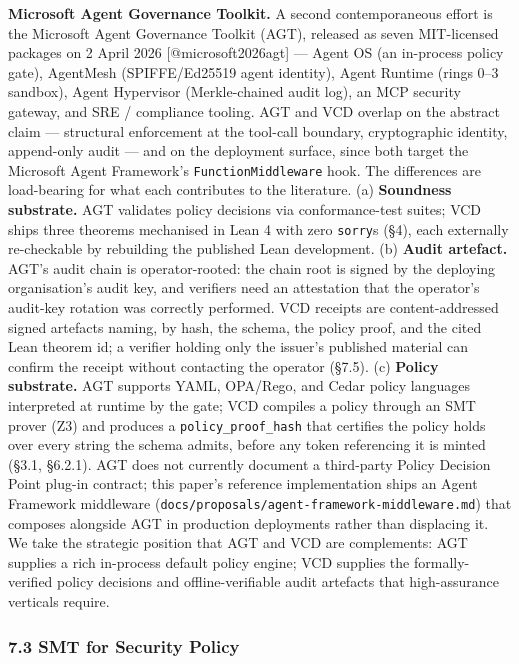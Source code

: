 \textbf{Microsoft Agent Governance Toolkit.} A second contemporaneous
effort is the Microsoft Agent Governance Toolkit (AGT), released as
seven MIT-licensed packages on 2 April 2026 {[}@microsoft2026agt{]} ---
Agent OS (an in-process policy gate), AgentMesh (SPIFFE/Ed25519 agent
identity), Agent Runtime (rings 0--3 sandbox), Agent Hypervisor
(Merkle-chained audit log), an MCP security gateway, and SRE /
compliance tooling. AGT and VCD overlap on the abstract claim ---
structural enforcement at the tool-call boundary, cryptographic
identity, append-only audit --- and on the deployment surface, since
both target the Microsoft Agent Framework's \texttt{FunctionMiddleware}
hook. The differences are load-bearing for what each contributes to the
literature. (a) \textbf{Soundness substrate.} AGT validates policy
decisions via conformance-test suites; VCD ships three theorems
mechanised in Lean 4 with zero \texttt{sorry}s (§4), each externally
re-checkable by rebuilding the published Lean development. (b)
\textbf{Audit artefact.} AGT's audit chain is operator-rooted: the chain
root is signed by the deploying organisation's audit key, and verifiers
need an attestation that the operator's audit-key rotation was correctly
performed. VCD receipts are content-addressed signed artefacts naming,
by hash, the schema, the policy proof, and the cited Lean theorem id; a
verifier holding only the issuer's published material can confirm the
receipt without contacting the operator (§7.5). (c) \textbf{Policy
substrate.} AGT supports YAML, OPA/Rego, and Cedar policy languages
interpreted at runtime by the gate; VCD compiles a policy through an SMT
prover (Z3) and produces a \texttt{policy\_proof\_hash} that certifies
the policy holds over every string the schema admits, before any token
referencing it is minted (§3.1, §6.2.1). AGT does not currently document
a third-party Policy Decision Point plug-in contract; this paper's
reference implementation ships an Agent Framework middleware
(\texttt{docs/proposals/agent-framework-middleware.md}) that composes
alongside AGT in production deployments rather than displacing it. We
take the strategic position that AGT and VCD are complements: AGT
supplies a rich in-process default policy engine; VCD supplies the
formally-verified policy decisions and offline-verifiable audit
artefacts that high-assurance verticals require.

\subsubsection{7.3 SMT for Security
Policy}\label{smt-for-security-policy}

